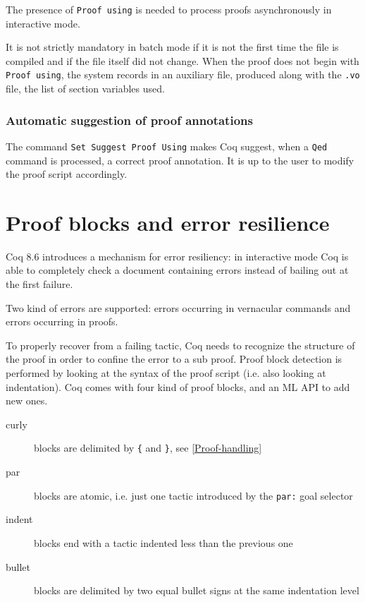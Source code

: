 The presence of \texttt{Proof using} is needed to process proofs
asynchronously in interactive mode.

It is not strictly mandatory in batch mode if it is not the first time
the file is compiled and if the file itself did not change. When the
proof does not begin with \texttt{Proof using}, the system records in an
auxiliary file, produced along with the \texttt{.vo} file, the list of
section variables used.

\subsubsection{Automatic suggestion of proof annotations}

The command \texttt{Set Suggest Proof Using} makes Coq suggest, when a
\texttt{Qed} command is processed, a correct proof annotation. It is up
to the user to modify the proof script accordingly.

\section{Proof blocks and error resilience}

Coq 8.6 introduces a mechanism for error resiliency: in interactive mode Coq
is able to completely check a document containing errors instead of bailing
out at the first failure.

Two kind of errors are supported: errors occurring in vernacular commands and
errors occurring in proofs.

To properly recover from a failing tactic, Coq needs to recognize the structure of
the proof in order to confine the error to a sub proof.  Proof block detection
is performed by looking at the syntax of the proof script (i.e. also looking at indentation).
Coq comes with four kind of proof blocks, and an ML API to add new ones.

\begin{description}
\item[curly] blocks are delimited by \texttt{\{} and \texttt{\}}, see \ref{Proof-handling}
\item[par] blocks are atomic, i.e. just one tactic introduced by the \texttt{par:} goal selector
\item[indent] blocks end with a tactic indented less than the previous one
\item[bullet] blocks are delimited by two equal bullet signs at the same indentation level
\end{description}

